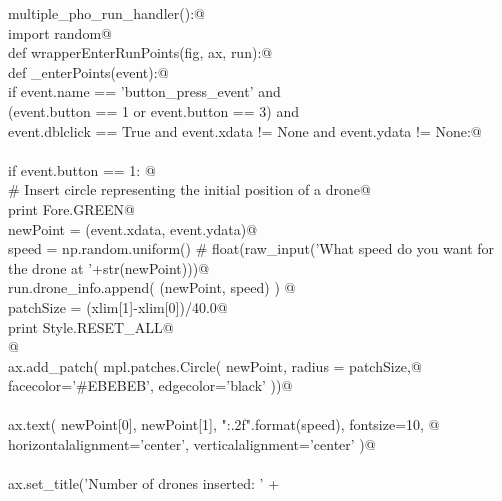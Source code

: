 \documentclass[10pt, english, oneside]{report}
\begin{document}
\begin{appendices}
\begin{flushleft}
\begin{list}{}{}
\mbox{}\verb@def multiple_pho_run_handler():@\\
\mbox{}\verb@    import random@\\
\mbox{}\verb@    def wrapperEnterRunPoints(fig, ax, run):@\\
\mbox{}\verb@      def _enterPoints(event):@\\
\mbox{}\verb@        if event.name      == 'button_press_event'          and \@\\
\mbox{}\verb@           (event.button   == 1 or event.button == 3)       and \@\\
\mbox{}\verb@            event.dblclick == True and event.xdata  != None and event.ydata  != None:@\\
\mbox{}\verb@@\\
\mbox{}\verb@             if event.button == 1:  @\\
\mbox{}\verb@                 # Insert circle representing the initial position of a drone@\\
\mbox{}\verb@                 print Fore.GREEN@\\
\mbox{}\verb@                 newPoint = (event.xdata, event.ydata)@\\
\mbox{}\verb@                 speed    = np.random.uniform() # float(raw_input('What speed do you want for the drone at '+str(newPoint)))@\\
\mbox{}\verb@                 run.drone_info.append( (newPoint, speed) ) @\\
\mbox{}\verb@                 patchSize  = (xlim[1]-xlim[0])/40.0@\\
\mbox{}\verb@                 print Style.RESET_ALL@\\
\mbox{}\verb@                 @\\
\mbox{}\verb@                 ax.add_patch( mpl.patches.Circle( newPoint, radius = patchSize,@\\
\mbox{}\verb@                                                   facecolor='#EBEBEB', edgecolor='black'  ))@\\
\mbox{}\verb@@\\
\mbox{}\verb@                 ax.text( newPoint[0], newPoint[1], "{:.2f}".format(speed), fontsize=10, @\\
\mbox{}\verb@                          horizontalalignment='center', verticalalignment='center' )@\\
\mbox{}\verb@@\\
\mbox{}\verb@                 ax.set_title('Number of drones inserted: ' +\@\\

\end{list}
\end{flushleft}
\end{appendices}
\end{document}
